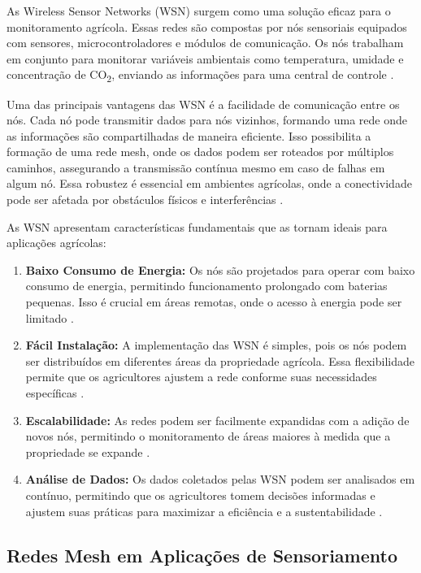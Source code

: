 As Wireless Sensor Networks (WSN) surgem como uma solução eficaz para o monitoramento agrícola. Essas redes são compostas por nós sensoriais equipados com sensores, microcontroladores e módulos de comunicação. Os nós trabalham em conjunto para monitorar variáveis ambientais como temperatura, umidade e concentração de CO\textsubscript{2}, enviando as informações para uma central de controle \cite{anderson2017}.

Uma das principais vantagens das WSN é a facilidade de comunicação entre os nós. Cada nó pode transmitir dados para nós vizinhos, formando uma rede onde as informações são compartilhadas de maneira eficiente. Isso possibilita a formação de uma rede mesh, onde os dados podem ser roteados por múltiplos caminhos, assegurando a transmissão contínua mesmo em caso de falhas em algum nó. Essa robustez é essencial em ambientes agrícolas, onde a conectividade pode ser afetada por obstáculos físicos e interferências \cite{zhao2018, chen2021}.

As WSN apresentam características fundamentais que as tornam ideais para aplicações agrícolas:

\begin{enumerate}
    \item \textbf{Baixo Consumo de Energia:} Os nós são projetados para operar com baixo consumo de energia, permitindo funcionamento prolongado com baterias pequenas. Isso é crucial em áreas remotas, onde o acesso à energia pode ser limitado \cite{Coelho2022}.
    \item \textbf{Fácil Instalação:} A implementação das WSN é simples, pois os nós podem ser distribuídos em diferentes áreas da propriedade agrícola. Essa flexibilidade permite que os agricultores ajustem a rede conforme suas necessidades específicas \cite{anderson2017}.
    \item \textbf{Escalabilidade:} As redes podem ser facilmente expandidas com a adição de novos nós, permitindo o monitoramento de áreas maiores à medida que a propriedade se expande \cite{lewis2019}.
    \item \textbf{Análise de Dados:} Os dados coletados pelas WSN podem ser analisados em contínuo, permitindo que os agricultores tomem decisões informadas e ajustem suas práticas para maximizar a eficiência e a sustentabilidade \cite{anderson2017}.
\end{enumerate}

\subsection{Redes Mesh em Aplicações de Sensoriamento}

